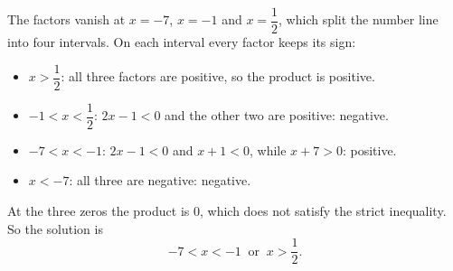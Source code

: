 The factors vanish at $x=-7$, $x=-1$ and $x=\dfrac{1}{2}$, which split the number line into four intervals. On each interval every factor keeps its sign:
\begin{itemize}
\item $x>\dfrac{1}{2}$: all three factors are positive, so the product is positive.
\item $-1<x<\dfrac{1}{2}$: $2x-1<0$ and the other two are positive: negative.
\item $-7<x<-1$: $2x-1<0$ and $x+1<0$, while $x+7>0$: positive.
\item $x<-7$: all three are negative: negative.
\end{itemize}
At the three zeros the product is $0$, which does not satisfy the strict inequality. So the solution is
\[\boxed{-7<x<-1\ \text{ or }\ x>\dfrac{1}{2}}.\]
